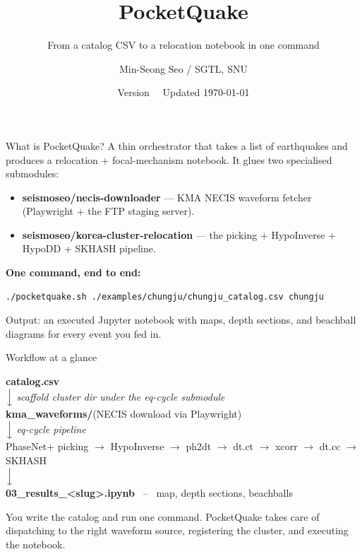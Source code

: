 \documentclass[10pt,aspectratio=169]{beamer}
\title{PocketQuake}
\subtitle{From a catalog CSV to a relocation notebook in one command}
\author{Min-Seong Seo / SGTL, SNU}
\date{Version \pqversion\ \textbar\ Updated \today}
\begin{document}
\maketitle

\begin{frame}[fragile]{What is PocketQuake?}
A thin orchestrator that takes a list of earthquakes and produces a
relocation + focal-mechanism notebook. It glues two specialised submodules:
\begin{itemize}
  \item \textbf{seismoseo/necis-downloader} --- KMA NECIS waveform fetcher
        (Playwright + the FTP staging server).
  \item \textbf{seismoseo/korea-cluster-relocation} --- the picking +
        HypoInverse + HypoDD + SKHASH pipeline.
\end{itemize}

\bigskip
\textbf{One command, end to end:}
\begin{lstlisting}
./pocketquake.sh ./examples/chungju/chungju_catalog.csv chungju
\end{lstlisting}
\bigskip
Output: an executed Jupyter notebook with maps, depth sections, and beachball
diagrams for every event you fed in.
\end{frame}

\begin{frame}{Workflow at a glance}
\begin{center}
\small
\textbf{catalog.csv} \\[2pt]
$\Big\downarrow$ \emph{scaffold cluster dir under the eq-cycle submodule} \\[4pt]
\textbf{kma\_waveforms/}\hspace{2em}(NECIS download via Playwright) \\[2pt]
$\Big\downarrow$ \emph{eq-cycle pipeline} \\[4pt]
PhaseNet+ picking $\to$ HypoInverse $\to$ ph2dt $\to$ dt.ct $\to$ xcorr $\to$ dt.cc $\to$ SKHASH \\[4pt]
$\Big\downarrow$ \\
\textbf{03\_results\_<slug>.ipynb} ~--~ map, depth sections, beachballs
\end{center}

\vspace{1em}
You write the catalog and run one command. PocketQuake takes care of dispatching
to the right waveform source, registering the cluster, and executing the
notebook.
\end{frame}
\end{document}
